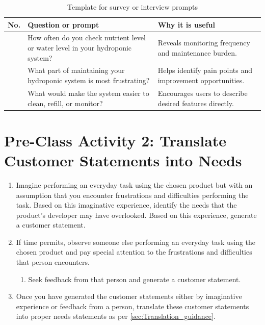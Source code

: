 \begin{table}[htbp]
\centering
\caption{Template for survey or interview prompts}
\label{tab:session7-question-template}
\renewcommand{\arraystretch}{1.2}
\begin{tabularx}{\textwidth}{|>{\raggedright\arraybackslash}p{}|>{\raggedright\arraybackslash}X|>{\raggedright\arraybackslash}p{}|}
\hline
\textbf{No.} & \textbf{Question or prompt} & \textbf{Why it is useful} \\
\hline
1 & How often do you check nutrient level or water level in your hydroponic system? & Reveals monitoring frequency and maintenance burden. \\
\hline
2 & What part of maintaining your hydroponic system is most frustrating? & Helps identify pain points and improvement opportunities. \\
\hline
3 & What would make the system easier to clean, refill, or monitor? & Encourages users to describe desired features directly. \\
\hline
\end{tabularx}
\end{table}

\section{Pre-Class Activity 2: Translate Customer Statements into Needs}

\begin{enumerate}
    \item Imagine performing an everyday task using the chosen product but with an assumption that you encounter frustrations and difficulties performing the task. Based on this imaginative experience, identify the needs that the product's developer may have overlooked. Based on this experience, generate a customer statement.
    \item If time permits, observe someone else performing an everyday task using the chosen product and pay special attention to the frustrations and difficulties that person encounters.
    \begin{enumerate}
        \item Seek feedback from that person and generate a customer statement.
    \end{enumerate}
    \item Once you have generated the customer statements either by imaginative experience or feedback from a person, translate these customer statements into proper needs statements as per \ref{sec:Translation_guidance}.
\end{enumerate}

